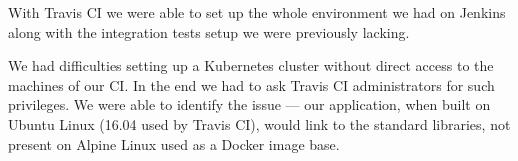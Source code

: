 With Travis CI we were able to set up the whole environment we had on Jenkins along with the
integration tests setup we were previously lacking.

We had difficulties setting up a Kubernetes cluster without direct access to the machines of our CI.
In the end we had to ask Travis CI
administrators for such privileges. We were able to identify the issue --- our application, when
built on Ubuntu Linux (16.04 used by Travis CI), would link to the standard libraries, not present
on Alpine Linux used as a Docker image base.

